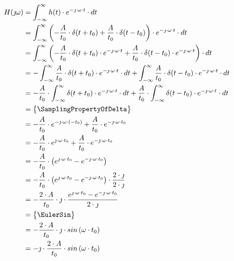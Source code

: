 \begin{task}
\begin{align*}
H(\jmath \omega )&=\int_{-\infty }^{\infty}h(t) \cdot e^{-\jmath \cdot \omega \cdot t}\cdot dt\\
&=\int_{-\infty }^{\infty}\left( -\frac{A}{t_0} \cdot \delta(t+t_0) + \frac{A}{t_0} \cdot \delta(t-t_0) \right) \cdot e^{-\jmath \cdot \omega \cdot t}\cdot dt\\
&=\int_{-\infty }^{\infty}\left( -\frac{A}{t_0} \cdot \delta(t+t_0)\cdot e^{-\jmath \cdot \omega \cdot t} + \frac{A}{t_0} \cdot \delta(t-t_0)\cdot e^{-\jmath \cdot \omega \cdot t} \right) \cdot dt\\
&=-\int_{-\infty }^{\infty} \frac{A}{t_0} \cdot \delta(t+t_0)\cdot e^{-\jmath \cdot \omega \cdot t}\cdot dt + \int_{-\infty }^{\infty} \frac{A}{t_0} \cdot \delta(t-t_0)\cdot e^{-\jmath \cdot \omega \cdot t} \cdot dt\\
&= -\frac{A}{t_0} \cdot \int_{-\infty }^{\infty} \delta(t+t_0)\cdot e^{-\jmath \cdot \omega \cdot t}\cdot dt + \frac{A}{t_0} \cdot \int_{-\infty }^{\infty}  \delta(t-t_0)\cdot e^{-\jmath \cdot \omega \cdot t} \cdot dt\\
&=\begin{Bmatrix}
\SamplingPropertyOfDelta
\end{Bmatrix}\\
&= -\frac{A}{t_0} \cdot e^{-\jmath \cdot \omega \cdot (-t_0)} + \frac{A}{t_0} \cdot e^{-\jmath \cdot \omega \cdot t_0}\\
&= -\frac{A}{t_0} \cdot e^{\jmath \cdot \omega \cdot t_0} + \frac{A}{t_0} \cdot e^{-\jmath \cdot \omega \cdot t_0}\\
&= -\frac{A}{t_0} \cdot \left(e^{\jmath \cdot \omega \cdot t_0} - e^{-\jmath \cdot \omega \cdot t_0}\right)\\
&= -\frac{A}{t_0} \cdot \left(e^{\jmath \cdot \omega \cdot t_0} - e^{-\jmath \cdot \omega \cdot t_0}\right) \cdot \frac{2\cdot \jmath}{2\cdot \jmath}\\
&= -\frac{2\cdot A}{t_0} \cdot \jmath \cdot \frac{e^{\jmath \cdot \omega \cdot t_0} - e^{-\jmath \cdot \omega \cdot t_0}}{2\cdot \jmath}\\
&=\begin{Bmatrix}
\EulerSin
\end{Bmatrix}\\
&= -\frac{2\cdot A}{t_0} \cdot \jmath \cdot sin\left( \omega \cdot t_0\right)\\
&= -\jmath \cdot \frac{2\cdot A}{t_0} \cdot sin\left( \omega \cdot t_0\right)\\
\end{align*}


\end{task}
